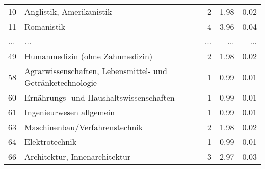 \begin{longtable}{lXrrr}
        10 & \multicolumn{1}{X}{Anglistik, Amerikanistik} & %
          \num{2} &
          \num[round-mode=places,round-precision=2]{1.98} &
          \num[round-mode=places,round-precision=2]{0.02} \\
        11 & \multicolumn{1}{X}{Romanistik} & %
          \num{4} &
          \num[round-mode=places,round-precision=2]{3.96} &
          \num[round-mode=places,round-precision=2]{0.04} \\
       ... & ... & ... & ... & ... \\
        49 & \multicolumn{1}{X}{Humanmedizin (ohne Zahnmedizin)} & %
          \num{2} &
          \num[round-mode=places,round-precision=2]{1.98} &
          \num[round-mode=places,round-precision=2]{0.02} \\

        58 & \multicolumn{1}{X}{Agrarwissenschaften, Lebensmittel- und Getränketechnologie} & %
          \num{1} &
          \num[round-mode=places,round-precision=2]{0.99} &
          \num[round-mode=places,round-precision=2]{0.01} \\

        60 & \multicolumn{1}{X}{Ernährungs- und Haushaltswissenschaften} & %
          \num{1} &
          \num[round-mode=places,round-precision=2]{0.99} &
          \num[round-mode=places,round-precision=2]{0.01} \\

        61 & \multicolumn{1}{X}{Ingenieurwesen allgemein} & %
          \num{1} &
          \num[round-mode=places,round-precision=2]{0.99} &
          \num[round-mode=places,round-precision=2]{0.01} \\

        63 & \multicolumn{1}{X}{Maschinenbau/Verfahrenstechnik} & %
          \num{2} &
          \num[round-mode=places,round-precision=2]{1.98} &
          \num[round-mode=places,round-precision=2]{0.02} \\

        64 & \multicolumn{1}{X}{Elektrotechnik} & %
          \num{1} &
          \num[round-mode=places,round-precision=2]{0.99} &
          \num[round-mode=places,round-precision=2]{0.01} \\

        66 & \multicolumn{1}{X}{Architektur, Innenarchitektur} & %
          \num{3} &
          \num[round-mode=places,round-precision=2]{2.97} &
          \num[round-mode=places,round-precision=2]{0.03} \\


\end{longtable}
